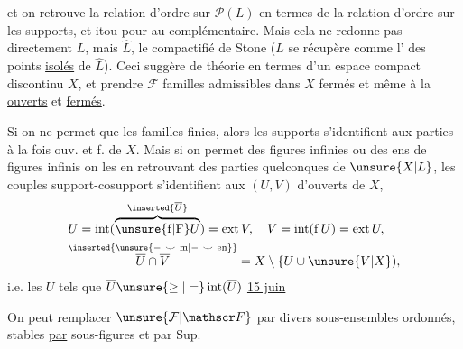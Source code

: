 et on retrouve la relation d'ordre sur $\mathcal P(L)$ en termes de la relation d'ordre sur les supports, et itou pour  au complémentaire. Mais cela ne redonne pas directement $L$, mais $\widehat L$, le compactifié de Stone ($L$ se récupère  comme l' des points \uline{isolés} de $\widehat L$). Ceci suggère de  théorie en termes d'un espace compact  discontinu $X$, et  prendre $\mathcal F$ familles admissibles dans $X$ fermés et même à la  \uline{ouverts} et \uline{fermés}.

Si on ne permet que les familles finies, alors les supports   s'identifient aux parties à la fois ouv. et f. de $X$. Mais
si on permet des figures infinies ou des ens de figures infinis on les  en retrouvant   des parties  quelconques de $\unsure{X|L}$,  les  couples support-cosupport s'identifient aux   $(U,V)$ d'ouverts de $X$,
\[
\begin{aligned}
& U=\operatorname{int}(\overbrace{\unsure{\mathrm f|\mathrm F}U}^{\inserted{\overline U}})=\operatorname{ext}V,\quad
 V=\operatorname{int}(\mathrm f\,U)=\operatorname{ext}U,\\
& \overset{\inserted{\unsure{-\ \smile\ \mathrm m|-\ \smile\ \mathrm{en}}}}{\overline U\cap\overline V} = X\setminus\{U\cup\unsure{V|X}),
\end{aligned}
\]
i.e. les  $U$ tels que $\overline U\unsure{\geq|= }\operatorname{int}(\overline U)$
 \uline{15 juin}

On peut remplacer $\unsure{\mathcal F|\mathscr F}$ par divers  sous-ensembles ordonnés, stables \uline{par} \deleted{$\unsure{\leq|\in}$}  
sous-figures  et par $\mathrm{Sup}$.

